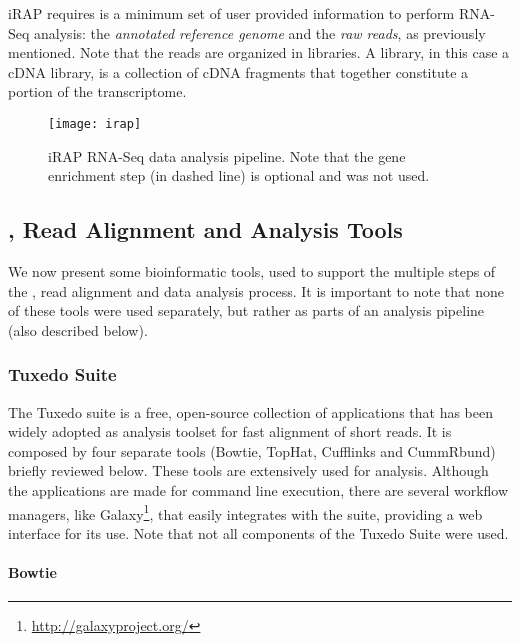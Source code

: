 iRAP requires is a minimum set of user provided information to perform RNA-Seq
analysis: the \emph{annotated reference genome} and the \emph{raw reads}, as
previously mentioned. Note that the reads are organized in libraries. A library,
in this case a cDNA library, is a collection of cDNA fragments that together
constitute a portion of the transcriptome.

\begin{figure}[!htb]
  \begin{center}
    \leavevmode
    \texttt{[image: irap]}
    \caption[iRAP RNA-Seq data analysis pipeline]{
      iRAP RNA-Seq data analysis pipeline. Note that the gene enrichment step
      (in dashed line) is optional and was not used.
    }
    \label{fig:irap}
  \end{center}
\end{figure}

\subsection{\rnaseq{}, Read Alignment and Analysis Tools}\label{sec:seqtools}

We now present some bioinformatic tools, used to support the multiple steps of
the \rnaseq{}, read alignment and data analysis process. It is important to note
that none of these tools were used separately, but rather as parts of an
analysis pipeline (also described below).

\subsubsection*{Tuxedo Suite}

The Tuxedo suite is a free, open-source collection of applications that has been
widely adopted as analysis toolset for fast alignment of short reads. It is
composed by four separate tools (Bowtie, TopHat, Cufflinks and CummRbund)
briefly reviewed below. These tools are extensively used for \rnaseq{} analysis.
Although the applications are made for command line execution, there are several
workflow managers, like Galaxy\footnote{\url{http://galaxyproject.org/}}, that
easily integrates with the suite, providing a web interface for its use. Note
that not all components of the Tuxedo Suite were used.

\paragraph{Bowtie}


